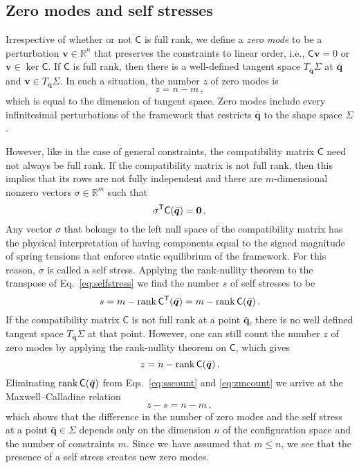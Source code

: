 \subsection{Zero modes and self stresses}

Irrespective of whether or not $\mathsf{C}$ is full rank, we define a \emph{zero mode} to be a perturbation $\bm{v} \in \mathbb{R}^n$ that preserves the constraints to linear order, i.e., $\mathsf{C}\bm{v} = 0$ or $\bm{v} \in \ker \mathsf{C}$.
If $\mathsf{C}$ is full rank, then there is a well-defined tangent space $T_{\bar{\bm{q}}}\Sigma$ at $\bar{\bm{q}}$ and $\bm{v} \in T_{\bar{\bm{q}}} \Sigma$.
In such a situation, the number $z$ of zero modes is
%
\begin{equation}
  z = n - m\,,
\end{equation}
%
which is equal to the dimension of tangent space.
Zero modes include every infinitesimal perturbations of the framework that restricts $\bar{\bm{q}}$ to the shape space $\Sigma$.

However, like in the case of general constraints, the compatibility matrix $\mathsf{C}$ need not always be full rank.
If the compatibility matrix is not full rank, then this implies that its rows are not fully independent and there are $m$-dimensional nonzero vectors $\sigma \in \mathbb{R}^m$ such that
\begin{equation}
  \sigma^\mathsf{T}\mathsf{C}(\bar{\bm{q}}) = \bm{0}\,.\label{eq:selfstress}
\end{equation}
Any vector $\sigma$ that belongs to the left null space of the compatibility matrix has the physical interpretation of having components equal to  the signed magnitude of spring tensions that enforce static equilibrium of the framework.
For this reason, $\sigma$ is called a self stress.
Applying the rank-nullity theorem to the transpose of Eq.~\eqref{eq:selfstress} we find the number $s$ of self stresses to be
\begin{equation}
  s = m - \operatorname{rank}{\mathsf{C}^\mathsf{T}(\bar{\bm{q}})} = m - \operatorname{rank}{\mathsf{C}(\bar{\bm{q}})}\,.\label{eq:sscount}
\end{equation}
If the compatibility matrix $\mathsf{C}$ is not full rank at a point $\bar{\bm{q}}$, there is no well defined tangent space $T_{\bar{\bm{q}}}\Sigma$ at that point.
However, one can still count the number $z$ of zero modes by applying the rank-nullity theorem on $\mathsf{C}$, which gives
\begin{equation}
  z = n - \operatorname{rank}{\mathsf{C}(\bar{\bm{q}})}\label{eq:zmcount}\,.
\end{equation}
Eliminating $\operatorname{rank}{\mathsf{C}(\bar{\bm{q}})}$ from Eqs.~\eqref{eq:sscount} and \eqref{eq:zmcount} we arrive at the Maxwell--Calladine relation
%
\begin{equation}
  z - s = n - m\,,\label{eq:mcindex}
\end{equation}
%
which shows that the difference in the number of zero modes and the self stress at a point $\bar{\bm{q}} \in \Sigma$ depends only on the dimension $n$ of the configuration space and the number of constraints $m$.
Since we have assumed that $m \leq n$, we see that the presence of a self stress creates new zero modes.

